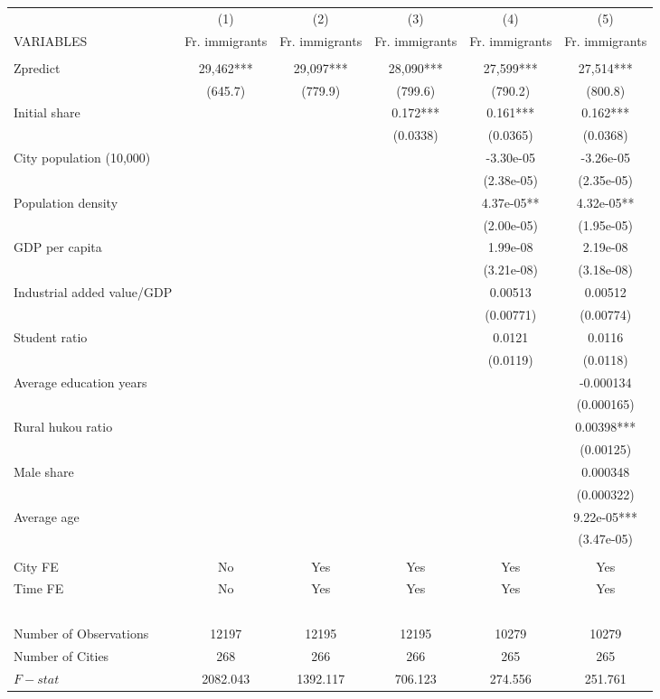 \begin{tabular}{lccccc} \hline
 & (1) & (2) & (3) & (4) & (5) \\
VARIABLES & Fr. immigrants & Fr. immigrants & Fr. immigrants & Fr. immigrants & Fr. immigrants \\ \hline
 &  &  &  &  &  \\
Zpredict & 29,462*** & 29,097*** & 28,090*** & 27,599*** & 27,514*** \\
 & (645.7) & (779.9) & (799.6) & (790.2) & (800.8) \\
Initial share &  &  & 0.172*** & 0.161*** & 0.162*** \\
 &  &  & (0.0338) & (0.0365) & (0.0368) \\
City population (10,000) &  &  &  & -3.30e-05 & -3.26e-05 \\
 &  &  &  & (2.38e-05) & (2.35e-05) \\
Population density &  &  &  & 4.37e-05** & 4.32e-05** \\
 &  &  &  & (2.00e-05) & (1.95e-05) \\
GDP per capita &  &  &  & 1.99e-08 & 2.19e-08 \\
 &  &  &  & (3.21e-08) & (3.18e-08) \\
Industrial added value/GDP &  &  &  & 0.00513 & 0.00512 \\
 &  &  &  & (0.00771) & (0.00774) \\
Student ratio &  &  &  & 0.0121 & 0.0116 \\
 &  &  &  & (0.0119) & (0.0118) \\
Average education years &  &  &  &  & -0.000134 \\
 &  &  &  &  & (0.000165) \\
Rural hukou ratio &  &  &  &  & 0.00398*** \\
 &  &  &  &  & (0.00125) \\
Male share &  &  &  &  & 0.000348 \\
 &  &  &  &  & (0.000322) \\
Average age &  &  &  &  & 9.22e-05*** \\
 &  &  &  &  & (3.47e-05) \\
 &  &  &  &  &  \\
City FE & No & Yes & Yes & Yes & Yes \\
Time FE & No & Yes & Yes & Yes & Yes \\
~ & ~ & ~ & ~ & ~ & ~ \\
Number of Observations & 12197 & 12195 & 12195 & 10279 & 10279 \\
Number of Cities & 268 & 266 & 266 & 265 & 265 \\
 $ F-stat$ & 2082.043 & 1392.117 & 706.123 & 274.556 & 251.761 \\ \hline
\end{tabular}
